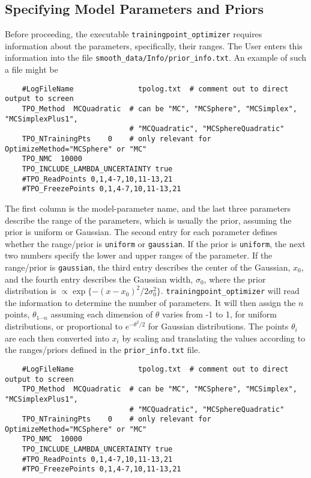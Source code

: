 \documentclass[UserManual.tex]{subfiles}
\begin{document}
\subsection{Specifying Model Parameters and Priors}\label{subsec:priorinfo}
Before proceeding, the executable {\tt trainingpoint\_optimizer} requires information about the parameters, specifically, their ranges. The User enters this information into the file {\tt smooth\_data/Info/prior\_info.txt}. An example of such a file might be
{\tt\begin{verbatim}
	#LogFileName               tpolog.txt  # comment out to direct output to screen
	TPO_Method  MCQuadratic  # can be "MC", "MCSphere", "MCSimplex", "MCSimplexPlus1",
							 # "MCQuadratic", "MCSphereQuadratic"
	TPO_NTrainingPts    0    # only relevant for OptimizeMethod="MCSphere" or "MC"
	TPO_NMC  10000
	TPO_INCLUDE_LAMBDA_UNCERTAINTY true
	#TPO_ReadPoints 0,1,4-7,10,11-13,21
	#TPO_FreezePoints 0,1,4-7,10,11-13,21
\end{verbatim}
}
The first column is the model-parameter name, and the last three parameters describe the range of the parameters, which is usually the prior, assuming the prior is uniform or Gaussian. The second entry for each parameter defines whether the range/prior is {\tt uniform} or {\tt gaussian}. If the prior is {\tt uniform}, the next two numbers specify the lower and upper ranges of the parameter. If the range/prior is {\tt gaussian}, the third entry describes the center of the Gaussian, $x_0$, and the fourth entry describes the Gaussian width, $\sigma_0$, where the prior distribution is $\propto \exp\{-(x-x_0)^2/2\sigma_0^2\}$. {\tt trainingpoint\_optimizer} will read the information to determine the number of parameters. It will then assign the $n$ points, $\theta_{1\cdots n}$ assuming each dimension of $\theta$ varies from -1 to 1, for uniform distributions, or proportional to $e^{-\theta^2/2}$ for Gaussian distributions. The points $\theta_i$ are each then converted into $x_i$ by scaling and translating the values according to the ranges/priors defined in the {\tt prior\_info.txt} file.

{\tt\begin{verbatim}
	#LogFileName               tpolog.txt  # comment out to direct output to screen
	TPO_Method  MCQuadratic  # can be "MC", "MCSphere", "MCSimplex", "MCSimplexPlus1",
							 # "MCQuadratic", "MCSphereQuadratic"
	TPO_NTrainingPts    0    # only relevant for OptimizeMethod="MCSphere" or "MC"
	TPO_NMC  10000
	TPO_INCLUDE_LAMBDA_UNCERTAINTY true
	#TPO_ReadPoints 0,1,4-7,10,11-13,21
	#TPO_FreezePoints 0,1,4-7,10,11-13,21
\end{verbatim}
}
\end{document}
